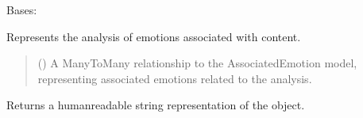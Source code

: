 \documentclass[letterpaper,10pt,english]{sphinxmanual}
\begin{document}
\begin{fulllineitems}
\label{\detokenize{source/meta_models_management:meta_models_management.models.EmotionAnalysis}}
\pysigstartsignatures
{}
\pysigstopsignatures
\sphinxAtStartPar
Bases: 

\sphinxAtStartPar
Represents the analysis of emotions associated with content.
\begin{quote}\begin{description}
\sphinxAtStartPar
{} () \textendash{} A ManyToMany relationship to the AssociatedEmotion model, representing associated emotions related to the analysis.

\end{description}\end{quote}

\begin{fulllineitems}
\label{\detokenize{source/meta_models_management:meta_models_management.models.EmotionAnalysis.__str__}}
\pysigstartsignatures
{}
\pysigstopsignatures
\sphinxAtStartPar
Returns a human\sphinxhyphen{}readable string representation of the object.

\end{fulllineitems}



\begin{fulllineitems}

\pysigstartsignatures
{}
\pysigstopsignatures
\end{fulllineitems}



\begin{fulllineitems}


\end{fulllineitems}
\end{fulllineitems}
\end{document}
